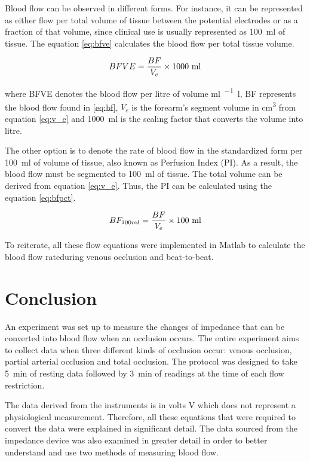 Blood flow can be observed in different forms. For instance, it can be represented as either flow per total volume of tissue between the potential electrodes or as a fraction of that volume, since clinical use is usually represented as \SI{100}{\milli\litre} of tissue. The equation \ref{eq:bfve} calculates the blood flow per total tissue volume.

\begin{align}
	\label{eq:bfve}
	BFVE = \frac{BF}{V_e} \times \text{1000 ml} \tagaddtext{[\si{\ml\per\min.\litre}]}
\end{align}

where BFVE denotes the blood flow per litre of volume \si{\ml\per\min.\litre}, BF represents the blood flow found in \ref{eq:bf}, $V_e$ is the forearm's segment volume in \si{\cubic\cm} from equation \ref{eq:v_e} and \SI{1000}{\milli\litre} is the scaling factor that converts the volume into litre.

The other option is to denote the rate of blood flow in the standardized form per \SI{100}{\milli\litre} of volume of tissue, also known as Perfusion Index (PI). As a result, the blood flow must be segmented to \SI{100}{\milli\litre} of tissue. The total volume can be derived from equation \ref{eq:v_e}. Thus, the PI can be calculated using the equation  \ref{eq:bfpct}. 

\begin{align}
	\label{eq:bfpct}
	BF_{100ml} = \frac{BF}{V_e} \times \text{100 ml} \tagaddtext{[\si{\bfv}]}
\end{align}

To reiterate, all these flow equations were implemented in Matlab to calculate the blood flow rateduring venous occlusion and beat-to-beat.

\section{Conclusion}
An experiment was set up to measure the changes of impedance that can be converted into blood flow when an occlusion occurs. The entire experiment aims to collect data when three different kinds of occlusion occur: venous occlusion, partial arterial occlusion and total occlusion. The protocol was designed to take \SI{5}{\minute} of resting data followed by \SI{3}{\minute} of readings at the time of each flow restriction.

The data derived from the instruments is in volts \si{\volt} which does not represent a physiological measurement. Therefore, all these equations that were required to convert the data were explained in significant detail. The data sourced from the impedance device was also examined in greater detail in order to better understand and use two methods of measuring blood flow.

